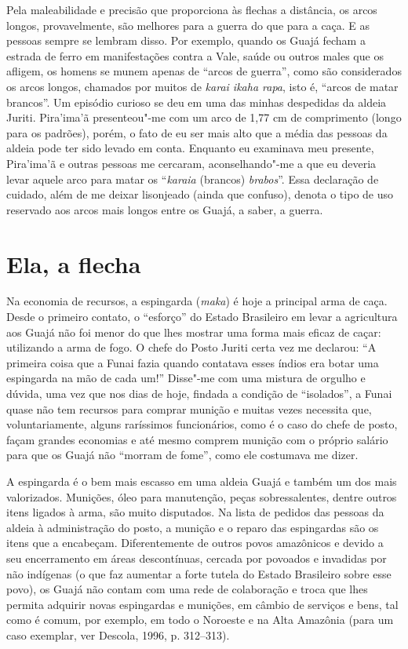 Pela maleabilidade e precisão que proporciona às flechas a distância, os
arcos longos, provavelmente, são melhores para a guerra do que para a
caça. E as pessoas sempre se lembram disso. Por exemplo, quando os Guajá
fecham a estrada de ferro em manifestações contra a Vale, saúde ou
outros males que os afligem, os homens se munem apenas de ``arcos de
guerra'', como são considerados os arcos longos, chamados por muitos de
\emph{karai ikaha rapa}, isto é, ``arcos de matar brancos''. Um episódio
curioso se deu em uma das minhas despedidas da aldeia Juriti. Pira'ima'ã
presenteou"-me com um arco de 1,77 cm de comprimento (longo para os
padrões), porém, o fato de eu ser mais alto que a média das pessoas da
aldeia pode ter sido levado em conta. Enquanto eu examinava meu
presente, Pira'ima'ã e outras pessoas me cercaram, aconselhando"-me a que
eu deveria levar aquele arco para matar os ``\emph{karaia} (brancos)
\emph{brabos}''. Essa declaração de cuidado, além de me deixar lisonjeado
(ainda que confuso), denota o tipo de uso reservado aos arcos mais
longos entre os Guajá, a saber, a guerra.

\section{Ela, a flecha}\label{ela-a-flecha}

Na economia de recursos, a espingarda (\emph{maka}) é hoje a principal
arma de caça. Desde o primeiro contato, o ``esforço'' do Estado Brasileiro
em levar a agricultura aos Guajá não foi menor do que lhes mostrar uma
forma mais eficaz de caçar: utilizando a arma de fogo. O chefe do Posto
Juriti certa vez me declarou: ``A primeira coisa que a Funai fazia quando
contatava esses índios era botar uma espingarda na mão de cada um!''
Disse"-me com uma mistura de orgulho e dúvida, uma vez que nos dias de
hoje, findada a condição de ``isolados'', a Funai quase não tem recursos
para comprar munição e muitas vezes necessita que, voluntariamente,
alguns raríssimos funcionários, como é o caso do chefe de posto, façam
grandes economias e até mesmo comprem munição com o próprio salário para
que os Guajá não ``morram de fome'', como ele costumava me dizer.

A espingarda é o bem mais escasso em uma aldeia Guajá e também um dos
mais valorizados. Munições, óleo para manutenção, peças sobressalentes,
dentre outros itens ligados à arma, são muito disputados. Na lista de
pedidos das pessoas da aldeia à administração do posto, a munição e o
reparo das espingardas são os itens que a encabeçam. Diferentemente de
outros povos amazônicos e devido a seu encerramento em áreas
descontínuas, cercada por povoados e invadidas por não indígenas (o que
faz aumentar a forte tutela do Estado Brasileiro sobre esse povo), os
Guajá não contam com uma rede de colaboração e troca que lhes permita
adquirir novas espingardas e munições, em câmbio de serviços e bens, tal
como é comum, por exemplo, em todo o Noroeste e na Alta Amazônia (para
um caso exemplar, ver Descola, 1996, p. 312--313).


